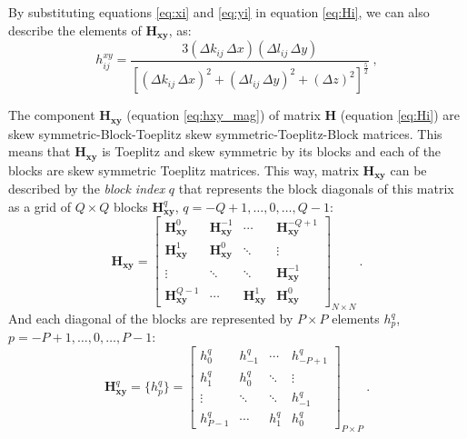 By substituting equations \ref{eq:xi} and \ref{eq:yi} in equation \ref{eq:Hi}, we can also describe the elements of $\mathbf{H_{xy}}$, as:
\begin{equation}
	h^{xy}_{ij} = \frac{3 (\Delta k_{ij} \, \Delta x )(\Delta l_{ij} \, \Delta y )}{\left[ 
		\left( \Delta k_{ij} \, \Delta x \right)^{2} + 
		\left( \Delta l_{ij} \, \Delta y \right)^{2} + 
		\left( \Delta z \right)^{2} \right]^{\frac{5}{2}}} \: ,
	\label{eq:hxy_mag}
\end{equation}

The component $\mathbf{H_{xy}}$ (equation \ref{eq:hxy_mag}) of matrix $\mathbf{H}$ (equation \ref{eq:Hi}) are skew symmetric-Block-Toeplitz skew symmetric-Toeplitz-Block matrices. This means that $\mathbf{H_{xy}}$ is Toeplitz and skew symmetric by its blocks and each of the blocks are skew symmetric Toeplitz matrices. 
This way, matrix $\mathbf{H_{xy}}$ can be described by the \textit{block index} $q$ that represents the block diagonals of this matrix as a grid of $Q \times Q$ blocks $\mathbf{H}^{q}_\mathbf{xy}$, $q = -Q + 1, \dots, 0, \dots, Q - 1$:
\begin{equation}
	\mathbf{H_{xy}} = \begin{bmatrix}
		\mathbf{H}^{0}_\mathbf{xy}  & \mathbf{H}^{-1}_\mathbf{xy} & \cdots         & \mathbf{H}^{-Q+1}_\mathbf{xy} \\
		\mathbf{H}^{1}_\mathbf{xy}  & \mathbf{H}^{0}_\mathbf{xy} & \ddots         & \vdots           \\ 
		\vdots           & \ddots         & \ddots         & \mathbf{H}^{-1}_\mathbf{xy}   \\
		\mathbf{H}^{Q-1}_\mathbf{xy} & \cdots         & \mathbf{H}^{1}_\mathbf{xy} & \mathbf{H}^{0}_\mathbf{xy}                
	\end{bmatrix}_{N \times N} \: .
	\label{eq:BTTB_Hxy}
\end{equation}
And each diagonal of the blocks are represented by $P \times P$ elements $h^{q}_{p}$, $p = -P + 1, \dots, 0, \dots, P - 1$:
\begin{equation}
	\mathbf{H}^{q}_\mathbf{xy} =  \{h^{q}_p\} = \begin{bmatrix}
		h^{q}_{0}   & h^{q}_{-1} & \cdots    & h^{q}_{-P+1} \\
		h^{q}_{1}   & h^{q}_{0} & \ddots    & \vdots           \\ 
		\vdots      & \ddots    & \ddots    & h^{q}_{-1}   \\
		h^{q}_{P-1} & \cdots    & h^{q}_{1} & h^{q}_{0}                 
	\end{bmatrix}_{P \times P} \: .
	\label{eq:Hxy_block}
\end{equation}
